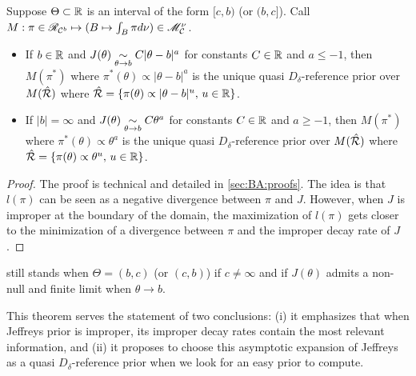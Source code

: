     
    
    
    
    \begin{thm}\label{thm:Jthetaa}
        Suppose $\Theta\subset\mathbb{R}$ is an interval of the form $[c,b)$ (or $(b,c]$). Call $M:\pi\in\mathscr{R}_{\mathcal{C}^b}\mapsto(B\mapsto\int_B \pi d\nu)\in\mathscr{M}^\nu_{\mathcal{C}}$. %
        \begin{itemize}
            \item If $b\in\mathbb{R}$ and $J(\theta)\underset{\theta\rightarrow b}{\sim}C|\theta-b|^a$ for constants $C\in\mathbb{R}$ and $a\leq-1$, then $M(\pi^\ast)$ where $\pi^\ast(\theta)\propto|\theta-b|^a$ is the unique quasi $D_\delta$-reference prior over $M(\hat{\mathcal{R}})$ where $\hat{\mathcal{R}} = \{\pi(\theta)\propto|\theta-b|^u,\,u\in\mathbb{R}\}$.
            \item If $|b|=\infty$ and $J(\theta)\underset{\theta\rightarrow b}{\sim}C\theta^a$ for constants $C\in\mathbb{R}$ and $a\geq-1$, then $M(\pi^\ast)$ where $\pi^\ast(\theta)\propto\theta^a$ is the unique quasi $D_\delta$-reference prior over $M(\hat{\mathcal{R}})$ where $\hat{\mathcal{R}} = \{\pi(\theta)\propto\theta^u,\,u\in\mathbb{R}\}$.
        \end{itemize}
    \end{thm}
    
    \begin{proof}
        The proof is technical and detailed in \cref{sec:BA:proofs}.
        The idea is that $l(\pi)$ can be seen as a negative divergence between $\pi$ and $J$. However, when $J$ is improper at the boundary of the domain, the maximization of $l(\pi)$ gets closer to the minimization of a divergence between $\pi$ and the improper decay rate of $J$.
    \end{proof}
    
    
    \begin{rem}
         still stands when $\Theta=(b,c)$ (or $(c,b)$) if $c\ne\infty$ and if $J(\theta)$ admits a non-null and finite limit when $\theta\to b$.
    \end{rem}
    
    
    
    
    This theorem serves the statement of two conclusions: (i) it emphasizes that when Jeffreys prior is improper, its improper decay rates contain the most relevant information, and (ii) it proposes to choose this asymptotic expansion of Jeffreys as a quasi $D_\delta$-reference prior when we look for an easy prior to compute.
    
    
    







